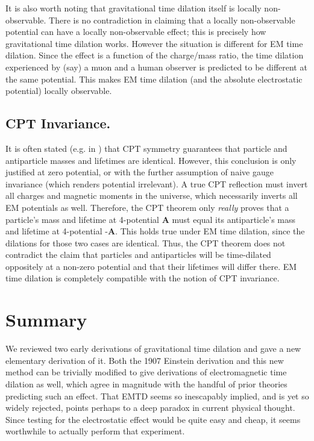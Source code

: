 It is also worth noting that gravitational time dilation itself is locally non-observable.
There is no contradiction in claiming that a locally non-observable potential
can have a locally non-observable effect;
this is precisely how gravitational time dilation works.
However the situation is different for EM time dilation.
Since the effect is a function of the charge/mass ratio,
the time dilation experienced by (say) a muon and a human observer
is predicted to be different at the same potential.
This makes EM time dilation (and the absolute electrostatic potential) locally observable.

\subsection{CPT Invariance.}

It is often stated (e.g. in \cite{Andreev2007,Murayama2003,Sachs1987}) that CPT symmetry
guarantees that particle and antiparticle masses and lifetimes are identical.
However, this conclusion is only justified at zero potential,
or with the further assumption of naive gauge invariance (which renders potential irrelevant).
A true CPT reflection must invert all charges and magnetic moments in the universe,
which necessarily inverts all EM potentials as well.
Therefore, the CPT theorem only \textit{really} proves that a particle's mass and lifetime at 4-potential \textbf{A} must equal its antiparticle's mass and lifetime at 4-potential -\textbf{A}.
This holds true under EM time dilation, since the dilations for those two cases are identical.
Thus, the CPT theorem does not contradict the claim that particles and antiparticles will be time-dilated oppositely at a non-zero potential and that their lifetimes will differ there.
EM time dilation is completely compatible with the notion of CPT invariance.

\section{Summary}
\label{sec:7}

We reviewed two early derivations of gravitational time dilation
and gave a new elementary derivation of it.
Both the 1907 Einstein derivation and this new method
can be trivially modified to give derivations of electromagnetic time dilation as well,
which agree in magnitude with the handful of prior theories predicting such an effect.
That EMTD seems so inescapably implied,
and is yet so widely rejected,
points perhaps to a deep paradox in current physical thought.
Since testing for the electrostatic effect would be quite easy and cheap,
it seems worthwhile to actually perform that experiment.


